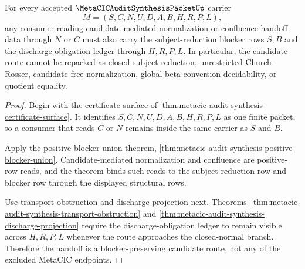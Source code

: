\begin{theorem}
\label{thm:metacic-audit-synthesis-candidate-normalization-handoff}
For every accepted $\MetaCICAuditSynthesisPacketUp$ carrier
$$
M=(S,C,N,U,D,A,B,H,R,P,L),
$$
any consumer reading candidate-mediated normalization or confluence handoff data through $N$ or $C$ must also carry the subject-reduction blocker rows $S,B$ and the discharge-obligation ledger through $H,R,P,L$. In particular, the candidate route cannot be repacked as closed subject reduction, unrestricted Church--Rosser, candidate-free normalization, global beta-conversion decidability, or quotient equality.
\end{theorem}
\begin{proof}
Begin with the certificate surface of \autoref{thm:metacic-audit-synthesis-certificate-surface}. It identifies $S,C,N,U,D,A,B,H,R,P,L$ as one finite packet, so a consumer that reads $C$ or $N$ remains inside the same carrier as $S$ and $B$.

Apply the positive-blocker union theorem, \autoref{thm:metacic-audit-synthesis-positive-blocker-union}. Candidate-mediated normalization and confluence are positive-row reads, and the theorem binds such reads to the subject-reduction row and blocker row through the displayed structural rows.

Use transport obstruction and discharge projection next. Theorems~\ref{thm:metacic-audit-synthesis-transport-obstruction} and \ref{thm:metacic-audit-synthesis-discharge-projection} require the discharge-obligation ledger to remain visible across $H,R,P,L$ whenever the route approaches the closed-normal branch. Therefore the handoff is a blocker-preserving candidate route, not any of the excluded MetaCIC endpoints.
\end{proof}

